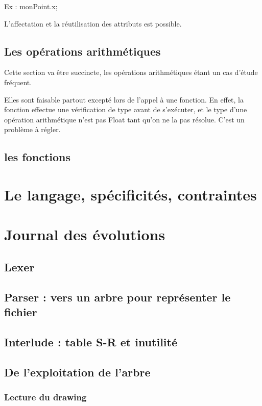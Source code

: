 \documentclass[11pt]{report} %
\begin{document}
Ex :
monPoint.x;

L'affectation et la réutilisation des attributs est possible.

\section{Les opérations arithmétiques}

Cette section va être succincte, les opérations arithmétiques étant un cas d'étude fréquent. 

Elles sont faisable partout excepté lors de l'appel à une fonction. En effet, la fonction effectue une vérification de type avant de s'exécuter, et le type d'une opération arithmétique n'est pas Float tant qu'on ne la pas résolue. C'est un problème à régler.

\section{les fonctions}



\chapter{Le langage, spécificités, contraintes} %

\appendix

\chapter{Journal des évolutions}
\section{Lexer}
\section{Parser : vers un arbre pour représenter le fichier}
\section{Interlude : table S-R et inutilité}

\section{De l'exploitation de l'arbre}
\subsection{Lecture du drawing}%
\end{document}

